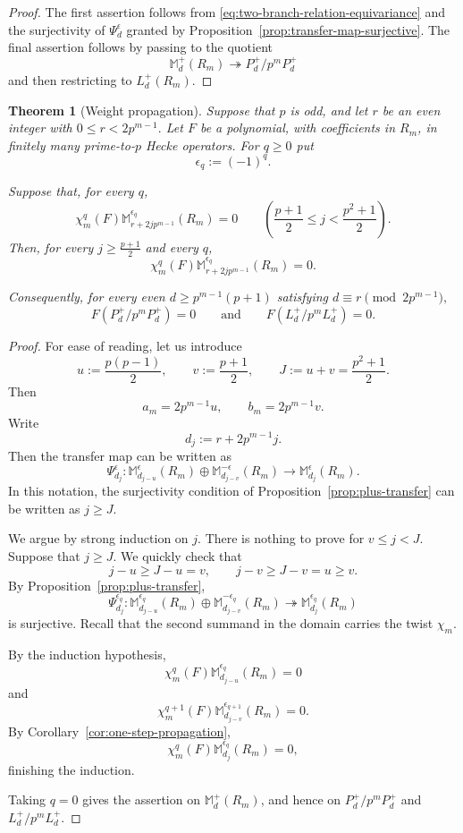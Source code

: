 \documentclass[11pt]{article}
\theoremstyle{plain}
\newtheorem{theorem}{Theorem}[section]
\theoremstyle{definition}
\theoremstyle{remark}
\numberwithin{equation}{section}
\begin{document}
\begin{proof}
The first assertion follows from \eqref{eq:two-branch-relation-equivariance} and the surjectivity of \(\Psi_d^\epsilon\) granted by Proposition~\ref{prop:transfer-map-surjective}. The final assertion follows by passing to the quotient \[ \mathbb M_d^+(R_m) \twoheadrightarrow P_d^+/p^mP_d^+ \] and then restricting to \( L_d^+(R_m). \)
\end{proof}

\begin{theorem}[Weight propagation]\label{thm:weight-propagation} Suppose that \(p\) is odd, and let \(r\) be an even integer with \(0\leq r<2p^{m-1}. \) Let \(F\) be a polynomial, with coefficients in \(R_m\), in finitely many prime-to-\(p\) Hecke operators. For \( q \geq 0 \) put \[ \epsilon_q:=(-1)^q. \] 

Suppose that, for every \(q\), \[\chi_m^q(F)\mathbb M_{r+2jp^{m-1}}^{\epsilon_q}(R_m) = 0 \qquad \left( \frac{p+1}{2}\leq j<\frac{p^2+1}{2} \right). \] Then, for every \(j\geq \frac{p + 1}{2}\) and every \(q\), \[ \chi_m^q(F) \mathbb M_{r+2jp^{m-1}}^{\epsilon_q}(R_m) = 0. \]

Consequently, for every even \(d\geq p^{m-1}(p + 1)\) satisfying \( d\equiv r\pmod{2p^{m-1}}, \) \[F \left(P_d^+/p^m P_d^+\right) = 0 \qquad\text{and}\qquad F \left( L_d^+ / p^m L_d^+\right) = 0. \]
\end{theorem}

\begin{proof} For ease of reading, let us introduce \[u := \frac{p(p-1)}{2}, \qquad v := \frac{p+1}{2}, \qquad J := u + v = \frac{p^2 + 1}{2}.\] Then \[a_m = 2p^{m-1}u, \qquad b_m = 2p^{m-1}v.\] Write \[d_j := r + 2p^{m-1}j.\] Then the transfer map can be written as \[\Psi^\epsilon_{d_j}: \mathbb M_{d_{j-u}}^\epsilon(R_m) \oplus \mathbb M_{d_{j-v}}^{-\epsilon}(R_m) \rightarrow \mathbb M_{d_j}^\epsilon(R_m). \] In this notation, the surjectivity condition of Proposition~\ref{prop:plus-transfer} can be written as \(j \geq J.\)

We argue by strong induction on \(j\). There is nothing to prove for \(v\leq j< J. \) Suppose that \( j\geq J. \) We quickly check that \[j - u \geq J - u=v, \qquad j- v\geq J-v=u\geq v.\] By Proposition~\ref{prop:plus-transfer}, \[\Psi_{d_j}^{\epsilon_q}:\mathbb M_{d_{j-u}}^{\epsilon_q}(R_m) \oplus \mathbb M_{d_{j-v}}^{-\epsilon_q}(R_m)
\twoheadrightarrow \mathbb M_{d_j}^{\epsilon_q}(R_m) \] is surjective. Recall that the second summand in the domain carries the twist \(\chi_m\).

By the induction hypothesis,
\[ \chi_m^q(F) \mathbb M_{d_{j-u}}^{\epsilon_q}(R_m)=0 \] and \[ \chi_m^{q+1}(F) \mathbb M_{d_{j-v}}^{\epsilon_{q+1}}(R_m)=0. \] By Corollary~\ref{cor:one-step-propagation}, \[ \chi_m^q(F)\mathbb M_{d_j}^{\epsilon_q}(R_m)=0, \] finishing the induction.

Taking \(q=0\) gives the assertion on \(\mathbb M_d^+(R_m)\), and hence on \(P_d^+/p^mP_d^+\) and \(L_d^+ / p^m L_d^+\). 
\end{proof}
\end{document}
